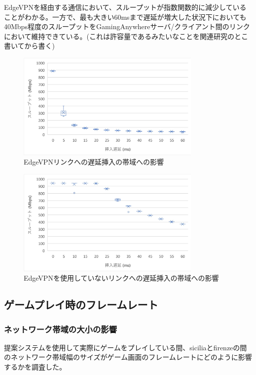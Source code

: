 EdgeVPNを経由する通信において、スループットが指数関数的に減少していることがわかる。一方で、最も大きい60msまで遅延が増大した状況下においても40Mbps程度のスループットをGamingAnywhereサーバ/クライアント間のリンクにおいて維持できている。(これは許容量であるみたいなことを関連研究のとこ書いてから書く)

\begin{figure}[t]
    \centering
    \includegraphics[width=0.8\textwidth,keepaspectratio,clip]{img/bandwidth_withEdgeVPN.pdf}
    \caption{EdgeVPNリンクへの遅延挿入の帯域への影響}
    \label{fig:band_with_edge}
\end{figure}

\begin{figure}[t]
    \centering
    \includegraphics[width=0.8\textwidth,keepaspectratio,clip]{img/bandwidth_withoutEdgeVPN.pdf}
    \caption{EdgeVPNを使用していないリンクへの遅延挿入の帯域への影響}
    \label{fig:band_without_edge}
\end{figure}

\subsection{ゲームプレイ時のフレームレート}

\subsubsection{ネットワーク帯域の大小の影響}
提案システムを使用して実際にゲームをプレイしている間、siciliaとfirenzeの間のネットワーク帯域幅のサイズがゲーム画面のフレームレートにどのように影響するかを調査した。


